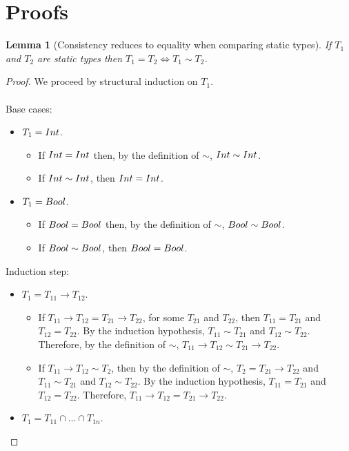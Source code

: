 \documentclass[a4paper]{article}
\newtheorem{lemma}{Lemma}
\begin{document}
\section{Proofs}
\begin{lemma}[Consistency reduces to equality when comparing static types]
\label{consistencytoequality}
If $T_1$ and $T_2$ are static types then $T_1 = T_2 \iff T_1 \sim T_2$.
\end{lemma}
\begin{proof}
We proceed by structural induction on $T_1$.\\\\
Base cases:
\begin{itemize}
    \item $T_1 = {Int}$.
    \begin{itemize}
        \item If ${Int} = {Int}$ then, by the definition of $\sim$, ${Int} \sim {\ensuremath{Int}}$.
        \item If ${Int} \sim {\ensuremath{Int}}$, then ${Int} = {Int}$.
    \end{itemize}
    \item $T_1 = Bool$.
    \begin{itemize}
        \item If $Bool = Bool$ then, by the definition of $\sim$, $Bool \sim Bool$.
        \item If $Bool \sim Bool$, then $Bool = Bool$.
    \end{itemize}
\end{itemize}
Induction step:
\begin{itemize}
    \item $T_1 = T_{11} \rightarrow T_{12}$.
    \begin{itemize}
        \item If $T_{11} \rightarrow T_{12} = T_{21} \rightarrow T_{22}$, for some $T_{21}$ and $T_{22}$, then $T_{11} = T_{21}$ and $T_{12} = T_{22}$.
        By the induction hypothesis, $T_{11} \sim T_{21}$ and $T_{12} \sim T_{22}$.
        Therefore, by the definition of $\sim$, $T_{11} \rightarrow T_{12} \sim T_{21} \rightarrow T_{22}$.
        \item If $T_{11} \rightarrow T_{12} \sim T_2$, then by the definition of $\sim$, $T_2 = T_{21} \rightarrow T_{22}$ and $T_{11} \sim T_{21}$ and $T_{12} \sim T_{22}$.
        By the induction hypothesis, $T_{11} = T_{21}$ and $T_{12} = T_{22}$.
        Therefore, $T_{11} \rightarrow T_{12} = T_{21} \rightarrow T_{22}$.
    \end{itemize}
    \item $T_1 = T_{11} \cap \ldots \cap T_{1n}$.

\end{itemize}
\end{proof}
\end{document}
